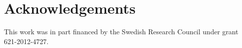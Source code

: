 {%
%
%

\section*{Acknowledgements}

This work was in part financed by the Swedish Research Council under
grant 621-2012-4727.


%


{\raggedright
\printbibliography[segment=\therefsegment,heading=subbibliography]
}

}
